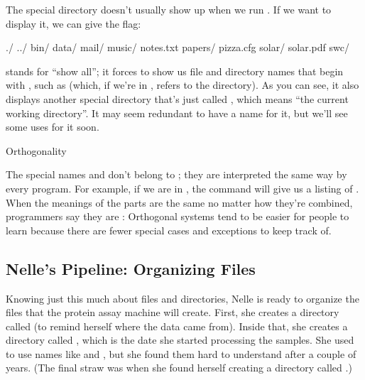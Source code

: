 The special directory  doesn't usually show up when we run
. If we want to display it, we can give  the
 flag:


\begin{VerbOut}
./           ../       bin/       data/
mail/        music/    notes.txt  papers/
pizza.cfg    solar/    solar.pdf    swc/
\end{VerbOut}

\noindent
{} stands for ``show all''; it forces  to show us
file and directory names that begin with , such as 
(which, if we're in , refers to the 
directory). As you can see, it also displays another special directory
that's just called , which means ``the current working
directory''. It may seem redundant to have a name for it, but we'll see
some uses for it soon.

\begin{swcbox}{Orthogonality}

The special names  and  don't belong to
; they are interpreted the same way by every program. For
example, if we are in , the command
 will give us a listing of . When the
meanings of the parts are the same no matter how they're combined,
programmers say they are : Orthogonal
systems tend to be easier for people to learn because there are fewer
special cases and exceptions to keep track of.

\end{swcbox}

\subsection*{Nelle's Pipeline: Organizing Files}

Knowing just this much about files and directories, Nelle is ready to
organize the files that the protein assay machine will create. First,
she creates a directory called  (to remind
herself where the data came from). Inside that, she creates a directory
called , which is the date she started processing the
samples. She used to use names like  and
, but she found them hard to understand after a
couple of years. (The final straw was when she found herself creating a
directory called .)

